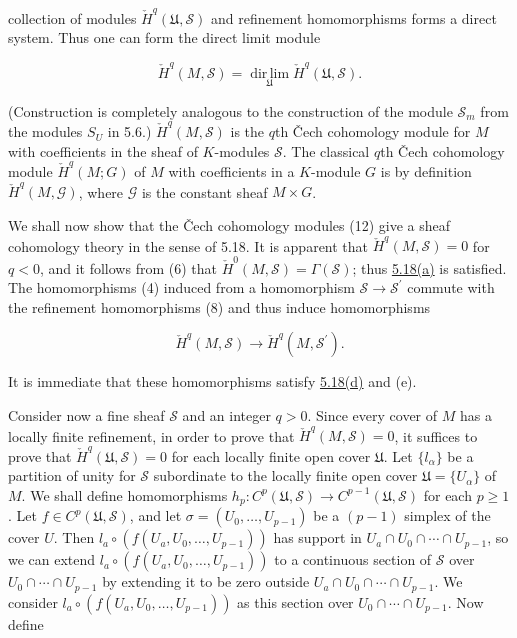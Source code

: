 collection of modules $\check{H}^{q}(\mathfrak{U},\mathcal{S})$ and refinement homomorphisms forms a direct system. Thus one can form the direct limit module

\begin{equation}
\tag{12}\label{eq:5.33:12}
\check{H}^{q}(M,\mathcal{S})=\operatorname*{dir\,lim}_{\mathfrak{U}}\check{H}^{q}(\mathfrak{U},\mathcal{S}).
\end{equation}

(Construction is completely analogous to the construction of the module $\mathcal{S}_{m}$ from the modules $S_{U}$ in 5.6.) $\check{H}^{q}(M,\mathcal{S})$ is the $q$th Čech cohomology module for $M$ with coefficients in the sheaf of $K$-modules $\mathcal{S}$. The classical $q$th Čech cohomology module $\check{H}^{q}(M;G)$ of $M$ with coefficients in a $K$-module $G$ is by definition $\check{H}^{q}(M,\mathcal{G})$, where $\mathcal{G}$ is the constant sheaf $M\times G$.

We shall now show that the Čech cohomology modules (12) give a sheaf cohomology theory in the sense of 5.18. It is apparent that  $ \check{H}^{q}(M,\mathcal{S})=0 $ for  $ q<0 $, and it follows from (6) that  $ \check{H}^{0}(M,\mathcal{S})=\Gamma(\mathcal{S}) $; thus \hyperref[thm:5.18]{5.18(a)} is satisfied. The homomorphisms (4) induced from a homomorphism  $ \mathcal{S}\to\mathcal{S}^{\prime} $ commute with the refinement homomorphisms (8) and thus induce homomorphisms

\begin{equation}
\tag{13}\label{eq:5.33:13}
\check{H}^{q}(M,\mathcal{S})\to\check{H}^{q}(M,\mathcal{S}^{\prime}).
\end{equation}

It is immediate that these homomorphisms satisfy \hyperref[thm:5.18]{5.18(d)} and (e).

Consider now a fine sheaf $\mathcal{S}$ and an integer $q>0$. Since every cover of $M$ has a locally finite refinement, in order to prove that $\check{H}^{q}(M,\mathcal{S}) = 0$, it suffices to prove that $\check{H}^{q}(\mathfrak{U},\mathcal{S}) = 0$ for each locally finite open cover $\mathfrak{U}$. Let $\{l_{\alpha}\}$ be a partition of unity for $\mathcal{S}$ subordinate to the locally finite open cover $\mathfrak{U} = \{U_{\alpha}\}$ of $M$. We shall define homomorphisms $h_{p}: C^{p}(\mathfrak{U},\mathcal{S}) \to C^{p-1}(\mathfrak{U},\mathcal{S})$ for each $p \geq 1$. Let $f \in C^{p}(\mathfrak{U},\mathcal{S})$, and let $\sigma = (U_{0}, \ldots, U_{p-1})$ be a $(p-1)$ simplex of the cover $U$. Then $l_{a} \circ (f(U_{a}, U_{0}, \ldots, U_{p-1}))$ has support in $U_{a} \cap U_{0} \cap \cdots \cap U_{p-1}$, so we can extend $l_{a} \circ (f(U_{a}, U_{0}, \ldots, U_{p-1}))$ to a continuous section of $\mathcal{S}$ over $U_{0} \cap \cdots \cap U_{p-1}$ by extending it to be zero outside $U_{a} \cap U_{0} \cap \cdots \cap U_{p-1}$. We consider $l_{a} \circ (f(U_{a}, U_{0}, \ldots, U_{p-1}))$ as this section over $U_{0} \cap \cdots \cap U_{p-1}$. Now define

